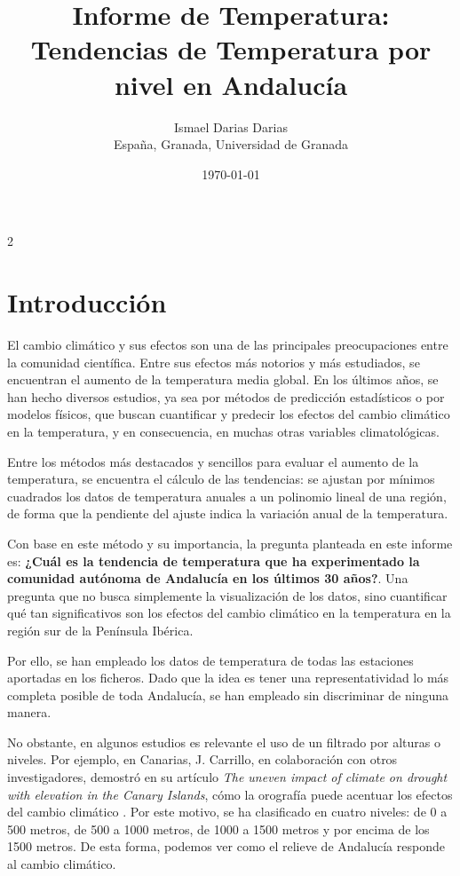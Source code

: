 \documentclass[a4paper]{article}
\title{\Huge \textbf{\textcolor{verdeVibrante}{Informe de Temperatura: Tendencias de Temperatura por nivel en Andalucía}}}
\author{Ismael Darias Darias \\ España, Granada, Universidad de Granada }
\date{\today}
\numberwithin{equation}{section}
\begin{document}
\maketitle


\begin{multicols}{2}
	\raggedcolumns
	\section{Introducción}
	El cambio climático y sus efectos son una de las principales preocupaciones entre la comunidad científica. Entre sus efectos más notorios y más estudiados, se encuentran el aumento de la temperatura media global. En los últimos años, se han hecho diversos estudios, ya sea por métodos de predicción estadísticos o por modelos físicos, que buscan cuantificar y predecir los efectos del cambio climático en la temperatura, y en consecuencia, en muchas otras variables climatológicas.

	Entre los métodos más destacados y sencillos para evaluar el aumento de la temperatura, se encuentra el cálculo de las tendencias: se ajustan por mínimos cuadrados los datos de temperatura anuales a un polinomio lineal de una región, de forma que la pendiente del ajuste indica la variación anual de la temperatura.

	Con base en este método y su importancia, la pregunta planteada en este informe es: \textbf{¿Cuál es la tendencia de temperatura que ha experimentado la comunidad autónoma de Andalucía en los últimos 30 años?}. Una pregunta que no busca simplemente la visualización de los datos, sino cuantificar qué tan significativos son los efectos del cambio climático en la temperatura en la región sur de la Península Ibérica.

	Por ello, se han empleado los datos de temperatura de todas las estaciones aportadas en los ficheros. Dado que la idea es tener una representatividad lo más completa posible de toda Andalucía, se han empleado sin discriminar de ninguna manera. 
	
	No obstante, en algunos estudios es relevante el uso de un filtrado por alturas o niveles. Por ejemplo, en Canarias, J. Carrillo, en colaboración con otros investigadores, demostró en su artículo \textit{The uneven impact of climate on drought with elevation in the Canary Islands}, cómo la orografía puede acentuar los efectos del cambio climático \cite{carrillo2023uneven}. Por este motivo, se ha clasificado en cuatro niveles: de 0 a 500 metros, de 500 a 1000 metros, de 1000 a 1500 metros y por encima de los 1500 metros. De esta forma, podemos ver como el relieve de Andalucía responde al cambio climático.


\end{multicols}
\end{document}

